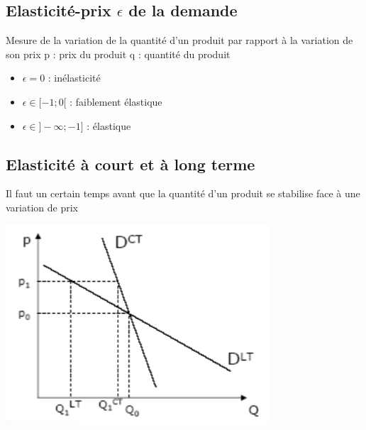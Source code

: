 \subsection{Elasticité-prix $\epsilon$ de la demande}
\begin{center}
\end{center}
Mesure de la variation de la quantité d'un produit par rapport à la variation de son prix
p : prix du produit \newline
q : quantité du produit
\begin{itemize}
    \item $\epsilon = 0 $ : inélasticité
    \item $\epsilon \in [-1;0[$ : faiblement élastique
    \item $\epsilon \in ]-\infty;-1]$ : élastique
\end{itemize}
\subsection{Elasticité à court et à long terme}
Il faut un certain  temps avant que la quantité d'un produit se stabilise face à une variation de prix
\begin{center}
    \includegraphics[scale = 1]{Pics/elasticite_court_et_long_terme.png}
\end{center}
\newpage
